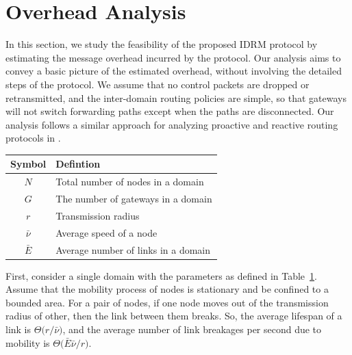 
\section{Overhead Analysis}
\label{sec::analysis}

In this section, we study the feasibility of the proposed IDRM protocol by estimating the
message overhead incurred by the protocol. 
Our analysis aims to convey a basic picture of the estimated overhead,
without involving the detailed steps of the protocol.
We assume that no control packets are dropped or retransmitted, and
the inter-domain routing policies are simple, so that gateways will
not switch forwarding paths except when the paths are disconnected.
Our analysis follows a similar approach for analyzing proactive and reactive
routing protocols in \cite{CJV04overhead}.

\begin{table}[htb!] \centering
        \begin{tabular}{|c||l|} \hline
        Symbol & Defintion \\
        \hline\hline
        ${N}$ & Total number of nodes in a domain \\
        ${G}$ & The number of gateways in a domain \\ 
        $r$  & Transmission radius \\ 
        $\bar{\nu}$ & Average speed of a node \\ 
        $\bar{E}$ & Average number of links in a domain \\ \hline	
        \end{tabular}  \label{tab:manet_def} 
\end{table} 


First, consider a single domain with the parameters as defined in
Table~\ref{tab:manet_def}.  Assume that the mobility process of nodes
is stationary and be confined to a bounded area. For a pair of nodes,
if one node moves out of the transmission radius of other, then the
link between them breaks. So, the average lifespan of a
link is
$\Theta\big(r\slash\bar{\nu}\big)$,
and the average number of link breakages per second due to mobility is
$\Theta\big(\bar{E}\bar{\nu}\slash r\big)$.

